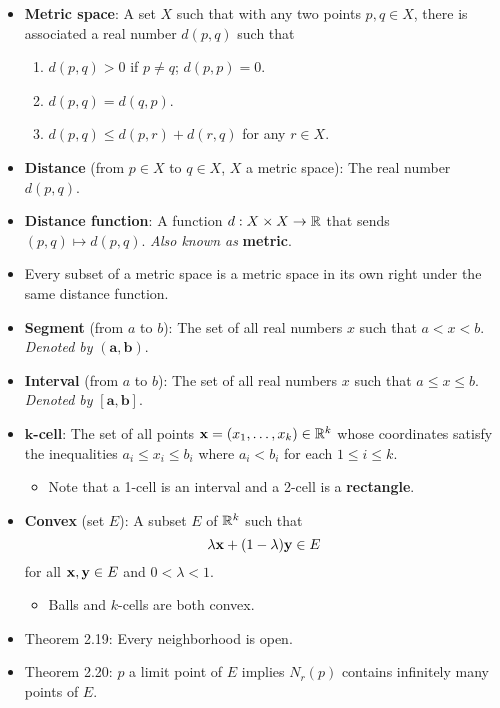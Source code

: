 \documentclass[../../notes.tex]{subfiles}
\begin{document}
\begin{itemize}
\begin{itemize}
    \end{itemize}
    \item \textbf{Metric space}: A set $X$ such that with any two points $p,q\in X$, there is associated a real number $d(p,q)$ such that
    \begin{enumerate}
        \item $d(p,q)>0$ if $p\neq q$; $d(p,p)=0$.
        \item $d(p,q)=d(q,p)$.
        \item $d(p,q)\leq d(p,r)+d(r,q)$ for any $r\in X$.
    \end{enumerate}
    \item \textbf{Distance} (from $p\in X$ to $q\in X$, $X$ a metric space): The real number $d(p,q)$.
    \item \textbf{Distance function}: A function $d:X\times X\to\mathbb{R}$ that sends $(p,q)\mapsto d(p,q)$. \emph{Also known as} \textbf{metric}.
    \item Every subset of a metric space is a metric space in its own right under the same distance function.
    \item \textbf{Segment} (from $a$ to $b$): The set of all real numbers $x$ such that $a<x<b$. \emph{Denoted by} $\bm{(a,b)}$.
    \item \textbf{Interval} (from $a$ to $b$): The set of all real numbers $x$ such that $a\leq x\leq b$. \emph{Denoted by} $\bm{[a,b]}$.
    \item \textbf{$\bm{k}$-cell}: The set of all points $\mathbf{x}=(x_1,\dots,x_k)\in\mathbb{R}^k$ whose coordinates satisfy the inequalities $a_i\leq x_i\leq b_i$ where $a_i<b_i$ for each $1\leq i\leq k$.
    \begin{itemize}
        \item Note that a 1-cell is an interval and a 2-cell is a \textbf{rectangle}.
    \end{itemize}
    \item \textbf{Convex} (set $E$): A subset $E$ of $\mathbb{R}^k$ such that
    \begin{equation*}
        \lambda\mathbf{x}+(1-\lambda)\mathbf{y} \in E
    \end{equation*}
    for all $\mathbf{x},\mathbf{y}\in E$ and $0<\lambda<1$.
    \begin{itemize}
        \item Balls and $k$-cells are both convex.
    \end{itemize}
    \item Theorem 2.19: Every neighborhood is open.
    \item Theorem 2.20: $p$ a limit point of $E$ implies $N_r(p)$ contains infinitely many points of $E$.

\end{itemize}
\end{document}
